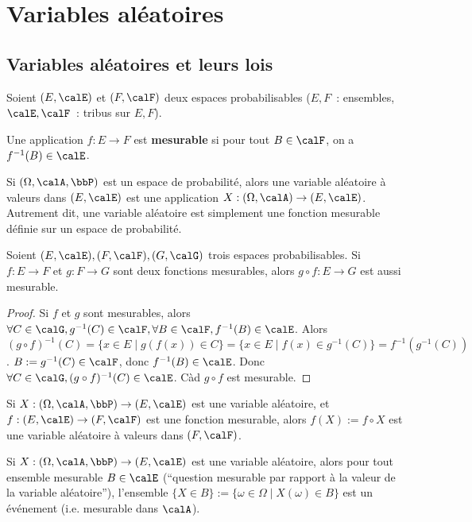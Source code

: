 \chapter{Variables aléatoires}

\section{Variables aléatoires et leurs lois}

Soient $(E, \calE)$ et $(F, \calF)$ deux espaces probabilisables
($E, F$~: ensembles, $\calE, \calF$~: tribus sur $E, F$).

\begin{deff}
    Une application $f: E \to F$ est \textbf{mesurable} si pour tout $B \in \calF$, on a $f^{-1}(B) \in \calE$.
\end{deff}

Si $(\Omega, \calA, \bbP)$ est un espace de probabilité,
alors une variable aléatoire à valeurs dans $(E, \calE)$ est une application $X: (\Omega, \calA) \to (E, \calE)$.
Autrement dit, une variable aléatoire est simplement une fonction mesurable définie sur un espace de probabilité.

\begin{lem}
    Soient $(E, \calE), (F, \calF), (G, \calG)$ trois espaces probabilisables.
    Si $f: E \to F$ et $g: F \to G$ sont deux fonctions mesurables,
    alors $g \circ f: E \to G$ est aussi mesurable.
\end{lem}

\begin{proof}
    Si $f$ et $g$ sont mesurables,
    alors $\forall C \in \calG, g^{-1}(C) \in \calF, \forall B \in \calF, f^{-1}(B) \in \calE$.
    Alors $(g \circ f)^{-1}(C) = \{ x \in E \mid g(f(x)) \in C \}
        = \{ x \in E \mid f(x) \in g^{-1}(C) \} = f^{-1}(g^{-1}(C))$.
    $B := g^{-1}(C) \in \calF$, donc $f^{-1}(B) \in \calE$.
    Donc $\forall C \in \calG, (g \circ f)^{-1}(C) \in \calE$.
    Càd $g \circ f$ est mesurable.
\end{proof}

\begin{cor}
    Si $X: (\Omega, \calA, \bbP) \to (E, \calE)$ est une variable aléatoire,
    et $f: (E, \calE) \to (F, \calF)$ est une fonction mesurable,
    alors $f(X) := f \circ X$ est une variable aléatoire à valeurs dans $(F, \calF)$.
\end{cor}

\begin{rqq}
    Si $X: (\Omega, \calA, \bbP) \to (E, \calE)$ est une variable aléatoire,
    alors pour tout ensemble mesurable $B \in \calE$
    (``question mesurable par rapport à la valeur de la variable aléatoire''),
    l'ensemble $\{ X \in B \} := \{ \omega \in \Omega \mid X(\omega) \in B \}$ est un événement
    (i.e. mesurable dans $\calA$).
\end{rqq}

